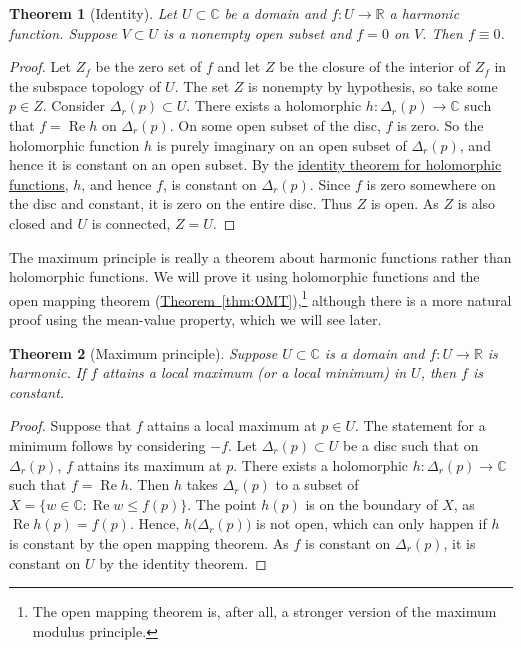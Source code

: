 \documentclass[12pt,openany]{book}
\renewcommand{\Re}{\operatorname{Re}}
\newcommand{\C}{{\mathbb{C}}}
\newcommand{\R}{{\mathbb{R}}}
\theoremstyle{plain}
\newtheorem{thm}{Theorem}[section]
\theoremstyle{remark}
\theoremstyle{definition}
\theoremstyle{exercise}
\theoremstyle{example}
\newcommand{\thmref}[1]{\hyperref[#1]{Theorem~\ref*{#1}}}
\begin{document}
\begin{thm}[Identity]
Let $U \subset \C$ be a domain and $f \colon U \to \R$ a harmonic function.
Suppose $V \subset U$ is a nonempty open subset and $f = 0$ on $V$.  Then $f
\equiv 0$.
\end{thm}

\begin{proof}
Let $Z_f$ be the zero set of $f$ and let $Z$ be the closure of the interior
of $Z_f$ in the subspace topology of $U$.
The set $Z$ is nonempty by hypothesis, so
take some $p \in Z$.  Consider $\Delta_r(p) \subset U$.
There exists a holomorphic $h \colon \Delta_r(p) \to \C$
such that $f = \Re h$ on $\Delta_r(p)$.
On some open subset of the disc, $f$ is zero.
So the holomorphic function $h$ is purely imaginary on
an open subset of $\Delta_r(p)$, and hence it is constant on an open subset.
By the \hyperref[thm:identity]{identity theorem for holomorphic functions},
$h$, and hence $f$, is constant 
on $\Delta_r(p)$.
Since $f$ is zero somewhere on the
disc and constant, it is zero on the entire disc.
Thus $Z$ is open.
As $Z$ is also closed and $U$ is connected, $Z=U$.
\end{proof}

The maximum principle is really a theorem about harmonic functions rather
than holomorphic functions.  We will prove it using holomorphic functions
and the open mapping theorem (\thmref{thm:OMT}),\footnote{%
The open mapping theorem is, after all,
a stronger version of the maximum modulus principle.}
although there is a more natural proof using the mean-value property,
which we will see later.

\begin{thm}[Maximum principle]
%
Suppose $U \subset \C$ is a domain and $f \colon U \to \R$
is harmonic.  If $f$ attains a local maximum (or a local minimum) in $U$, then $f$ is constant.
\end{thm}

\begin{proof}
Suppose that $f$ attains a local maximum at $p \in U$.
The statement for a minimum follows by considering $-f$.
Let $\Delta_r(p) \subset U$
be a disc such that
on $\Delta_r(p)$,
$f$ attains its maximum at $p$.
There exists a holomorphic $h \colon \Delta_r(p) \to \C$
such that $f = \Re h$.
Then $h$ takes
$\Delta_r(p)$ to a subset of $X = \bigl\{ w \in \C : \Re w \leq f(p) \bigr\}$.
The point $h(p)$ is on the boundary of $X$, as $\Re h(p)= f(p)$.  Hence,
$h\bigl(\Delta_r(p)\bigr)$ is not open, which can only happen if $h$ is
constant by the open mapping theorem.  As $f$ is constant on $\Delta_r(p)$, it is constant on $U$ by the
identity theorem.
\end{proof}
\end{document}
